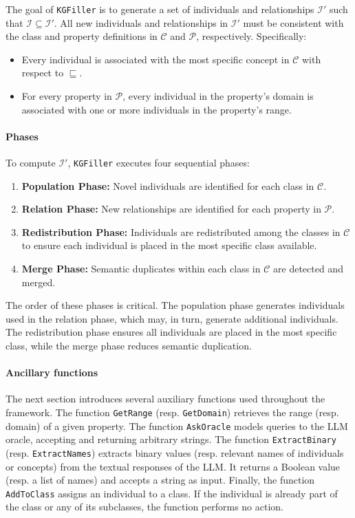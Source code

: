 %

The goal of \texttt{KGFiller} is to generate a set of individuals and relationships \(\mathcal{I}'\) such that \(\mathcal{I} \subseteq \mathcal{I}'\).
%
All new individuals and relationships in \(\mathcal{I}'\) must be consistent with the class and property definitions in \(\mathcal{C}\) and \(\mathcal{P}\), respectively.
%
Specifically:
%
\begin{itemize}
    \item Every individual is associated with the most specific concept in \(\mathcal{C}\) with respect to \(\sqsubseteq\).
    \item For every property in \(\mathcal{P}\), every individual in the property’s domain is associated with one or more individuals in the property’s range.
\end{itemize}


\paragraph{Phases}
To compute \(\mathcal{I}'\), \texttt{KGFiller} executes four sequential phases:
%
\begin{enumerate}
    \item \textbf{Population Phase:} Novel individuals are identified for each class in \(\mathcal{C}\).
    \item \textbf{Relation Phase:} New relationships are identified for each property in \(\mathcal{P}\).
    \item \textbf{Redistribution Phase:} Individuals are redistributed among the classes in \(\mathcal{C}\) to ensure each individual is placed in the most specific class available.
    \item \textbf{Merge Phase:} Semantic duplicates within each class in \(\mathcal{C}\) are detected and merged.
\end{enumerate}
%
The order of these phases is critical.
%
The population phase generates individuals used in the relation phase, which may, in turn, generate additional individuals.
%
The redistribution phase ensures all individuals are placed in the most specific class, while the merge phase reduces semantic duplication.


\paragraph{Ancillary functions}
%
The next section introduces several auxiliary functions used throughout the framework.
%
The function \texttt{GetRange} (resp. \texttt{GetDomain}) retrieves the range (resp. domain) of a given property.
%
The function \texttt{AskOracle} models queries to the \gls{LLM} oracle, accepting and returning arbitrary strings.
%
The function \texttt{ExtractBinary} (resp. \texttt{ExtractNames}) extracts binary values (resp. relevant names of individuals or concepts) from the textual responses of the \gls{LLM}.
%
It returns a Boolean value (resp. a list of names) and accepts a string as input.
%
Finally, the function \texttt{AddToClass} assigns an individual to a class.
%
If the individual is already part of the class or any of its subclasses, the function performs no action.


